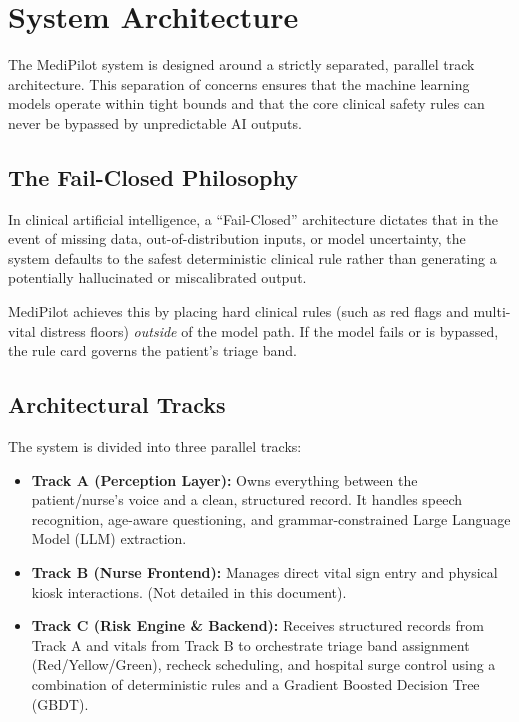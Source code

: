 \section{System Architecture}

The MediPilot system is designed around a strictly separated, parallel track architecture. This separation of concerns ensures that the machine learning models operate within tight bounds and that the core clinical safety rules can never be bypassed by unpredictable AI outputs.

\subsection{The Fail-Closed Philosophy}
In clinical artificial intelligence, a ``Fail-Closed'' architecture dictates that in the event of missing data, out-of-distribution inputs, or model uncertainty, the system defaults to the safest deterministic clinical rule rather than generating a potentially hallucinated or miscalibrated output. 

MediPilot achieves this by placing hard clinical rules (such as red flags and multi-vital distress floors) \textit{outside} of the model path. If the model fails or is bypassed, the rule card governs the patient's triage band.

\subsection{Architectural Tracks}
The system is divided into three parallel tracks:
\begin{itemize}
    \item \textbf{Track A (Perception Layer):} Owns everything between the patient/nurse's voice and a clean, structured record. It handles speech recognition, age-aware questioning, and grammar-constrained Large Language Model (LLM) extraction.
    \item \textbf{Track B (Nurse Frontend):} Manages direct vital sign entry and physical kiosk interactions. (Not detailed in this document).
    \item \textbf{Track C (Risk Engine \& Backend):} Receives structured records from Track A and vitals from Track B to orchestrate triage band assignment (Red/Yellow/Green), recheck scheduling, and hospital surge control using a combination of deterministic rules and a Gradient Boosted Decision Tree (GBDT).
\end{itemize}
